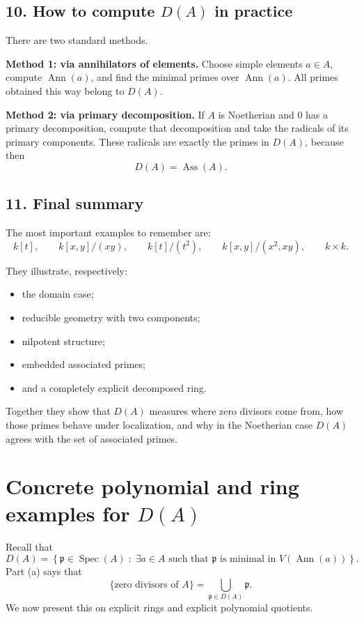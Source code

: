 \documentclass[12pt,a4paper,oneside]{report}
\DeclareMathOperator{\Spec}{Spec}
\DeclareMathOperator{\Ass}{Ass}
\DeclareMathOperator{\Ann}{Ann}
\theoremstyle{notespace}
\begin{document}
	\subsection{10. How to compute \(D(A)\) in practice}
	
	There are two standard methods.
	
	\medskip
	
	\noindent
	\textbf{Method 1: via annihilators of elements.}
	Choose simple elements \(a\in A\), compute \(\Ann(a)\), and find the minimal primes over \(\Ann(a)\).
	All primes obtained this way belong to \(D(A)\).
	
	\medskip
	
	\noindent
	\textbf{Method 2: via primary decomposition.}
	If \(A\) is Noetherian and \(0\) has a primary decomposition, compute that decomposition and take the radicals of its primary components.
	These radicals are exactly the primes in \(D(A)\), because then
	\[
	D(A)=\Ass(A).
	\]
	
	\subsection{11. Final summary}
	
	The most important examples to remember are:
	\[
	k[t],\qquad
	k[x,y]/(xy),\qquad
	k[t]/(t^2),\qquad
	k[x,y]/(x^2,xy),\qquad
	k\times k.
	\]
	
	They illustrate, respectively:
	\begin{itemize}
		\item the domain case;
		\item reducible geometry with two components;
		\item nilpotent structure;
		\item embedded associated primes;
		\item and a completely explicit decomposed ring.
	\end{itemize}
	
	Together they show that \(D(A)\) measures where zero divisors come from, how those primes behave under localization, and why in the Noetherian case \(D(A)\) agrees with the set of associated primes.
	
	
\section{Concrete polynomial and ring examples for \(D(A)\)}

Recall that
\[
D(A)=\left\{\mathfrak p\in \Spec(A)\;:\;\exists a\in A
\text{ such that }\mathfrak p \text{ is minimal in }V(\Ann(a))\right\}.
\]
Part (a) says that
\[
\{\text{zero divisors of }A\}=\bigcup_{\mathfrak p\in D(A)} \mathfrak p.
\]
We now present this on explicit rings and explicit polynomial quotients.
\end{document}
